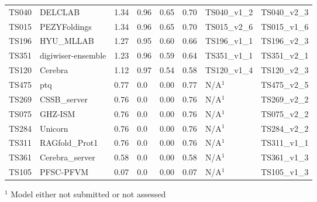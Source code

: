 \begin{table}[ht]
{\begin{tabular}{llllllll}
TS040 & DELCLAB & 1.34 & 0.96 & 0.65 & 0.70 & TS040\_v1\_2 & TS040\_v2\_3 \\ 
TS015 & PEZYFoldings & 1.34 & 0.96 & 0.65 & 0.70 & TS015\_v2\_6 & TS015\_v1\_6 \\ 
TS196 & HYU\_MLLAB & 1.27 & 0.95 & 0.60 & 0.66 & TS196\_v1\_1 & TS196\_v2\_3 \\ 
TS351 & digiwiser-ensemble & 1.23 & 0.96 & 0.59 & 0.64 & TS351\_v1\_1 & TS351\_v2\_1 \\ 
TS120 & Cerebra & 1.12 & 0.97 & 0.54 & 0.58 & TS120\_v1\_4 & TS120\_v2\_3 \\ 
TS475 & ptq & 0.77 & 0.0 & 0.00 & 0.77 & N/A$^{1}$ & TS475\_v2\_5 \\ 
TS269 & CSSB\_server & 0.76 & 0.0 & 0.00 & 0.76 & N/A$^{1}$ & TS269\_v2\_2 \\ 
TS075 & GHZ-ISM & 0.76 & 0.0 & 0.00 & 0.76 & N/A$^{1}$ & TS075\_v2\_2 \\ 
TS284 & Unicorn & 0.76 & 0.0 & 0.00 & 0.76 & N/A$^{1}$ & TS284\_v2\_2 \\ 
TS311 & RAGfold\_Prot1 & 0.76 & 0.0 & 0.00 & 0.76 & N/A$^{1}$ & TS311\_v1\_1 \\ 
TS361 & Cerebra\_server & 0.58 & 0.0 & 0.00 & 0.58 & N/A$^{1}$ & TS361\_v1\_3 \\ 
TS105 & PFSC-PFVM & 0.07 & 0.0 & 0.00 & 0.07 & N/A$^{1}$ & TS105\_v1\_3 \\ 
\bottomrule
\end{tabular}%
}
\begin{flushleft}\footnotesize $^{1}$ Model either not submitted or not assessed\end{flushleft}
\end{table}
